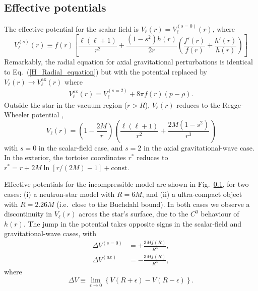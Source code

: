 \documentclass[aps,prd,longbibliography,reprint,twocolumn,amsmath,amssymb,amsfonts,showpacs,superscriptaddress]{revtex4-1}%
\begin{document}
\subsection{Effective potentials}
The effective potential for the scalar field is $V_{\ell}(r) = V_{\ell}^{(s=0)}(r)$, where
\begin{equation}\label{Inside_Potentiel}
  V_{\ell}^{(s)}(r) \equiv f(r)\left[\frac{\ell(\ell+1)}{r^2}+\frac{(1-s^2) h(r)}{2r}\left(\frac{f'(r)}{f(r)}+\frac{h'(r)}{h(r)}\right)\right]
\end{equation}
Remarkably, the radial equation for axial gravitational perturbations is identical to Eq.~(\ref{H_Radial_equation}) but with the potential replaced by $V_{\ell}(r) \rightarrow V_{\ell}^{\text{ax}}(r)$ where \cite{Cardoso:2014sna}
\begin{eqnarray}\label{RW_Potentiel_axialGW}
V_{\ell}^{\text{ax}}(r) = V_{\ell}^{(s=2)} + 8 \pi f(r) (p - \rho)  .
\end{eqnarray}
%
Outside the star in the vacuum region ($r>R$), $V_{\ell}(r)$ reduces to the Regge-Wheeler potential ,
\begin{equation}\label{RW_Potentiel}
  V_{\ell}(r) =\left(1-\frac{2M}{r}\right)\left(\frac{\ell(\ell+1)}{r^2}+\frac{2M(1-s^2)}{r^3}\right)
\end{equation}
with $s=0$ in the scalar-field case, and $s=2$ in the axial gravitational-wave case. In the exterior, the tortoise coordinates $r^\ast$ reduces to $r^\ast = r+ 2M \ln [r/(2M) -1]+\mathrm{const}$.

Effective potentials for the incompressible model are shown in Fig.~\ref{}, for two cases: (i) a neutron-star model with $R = 6M$, and (ii) a ultra-compact object with $R = 2.26M$ (i.e.~close to the Buchdahl bound). In both cases we observe a discontinuity in $V_{\ell}(r)$ across the star's surface, due to the $C^0$ behaviour of $h(r)$. The jump in the potential takes opposite signs in the scalar-field and gravitational-wave cases, with
\begin{subequations}
\begin{align}
\Delta V^{(s=0)} &= + \frac{3Mf(R)}{R^3} , \\
\Delta V^{(ax)} &= - \frac{3Mf(R)}{R^3} , 
\end{align}
\end{subequations}
where
\begin{equation}
\Delta V \equiv \lim_{\epsilon \rightarrow 0} \left\{ V(R + \epsilon) - V(R - \epsilon) \right\} . 
\end{equation}
\end{document}
